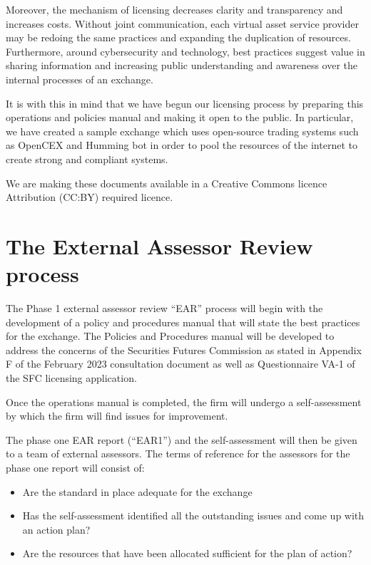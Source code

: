 Moreover, the mechanism of licensing decreases clarity and
transparency and increases costs.  Without joint communication, each
virtual asset service provider may be redoing the same practices and
expanding the duplication of resources.  Furthermore, around
cybersecurity and technology, best practices suggest value in sharing
information and increasing public understanding and awareness over the
internal processes of an exchange.

It is with this in mind that we have begun our licensing process by
preparing this operations and policies manual and making it open to
the public.  In particular, we have created a sample exchange which
uses open-source trading systems such as OpenCEX and Humming bot in
order to pool the resources of the internet to create strong and
compliant systems.

We are making these documents available in a Creative Commons licence
Attribution (CC:BY) required licence.

\section{The External Assessor Review process}

The Phase 1 external assessor review ``EAR'' process will begin with
the development of a policy and procedures manual that will state the best practices for the exchange.  The Policies and Procedures manual will
be developed to address the concerns of the Securities Futures
Commission as stated in Appendix F of the February 2023 consultation
document as well as Questionnaire VA-1 of the SFC licensing
application.

Once the operations manual is completed, the firm will undergo a
self-assessment by which the firm will find issues for improvement.

The phase one EAR report (``EAR1'') and the self-assessment will then
be given to a team of external assessors.  The terms of reference for
the assessors for the phase one report will consist of:

\begin{itemize}
\item Are the standard in place adequate for the exchange
  \item Has the self-assessment identified all the outstanding
    issues and come up with an action plan?
  \item Are the resources that have been allocated sufficient for the
    plan of action?
\end{itemize}

